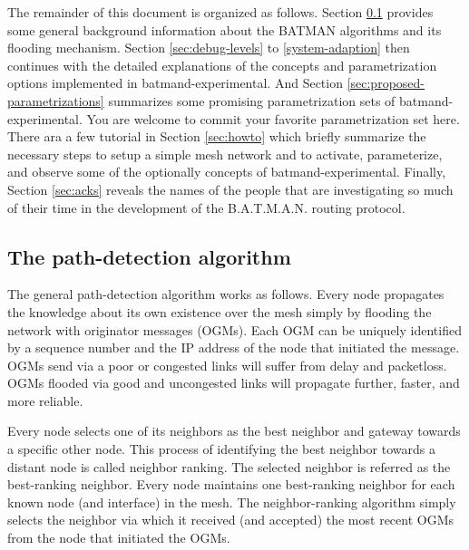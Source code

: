 \documentclass[11pt]{article}
\begin{document}
The remainder of this document is organized as follows.
%
Section \ref{sec:algorithm} provides some general background information about the BATMAN algorithms and its flooding mechanism. 
%
Section \ref{sec:debug-levels} to \ref{system-adaption} then continues with the detailed explanations of the concepts and parametrization options implemented in batmand-experimental.
%
And Section \ref{sec:proposed-parametrizations} summarizes some promising parametrization sets of batmand-experimental. You are welcome to commit your favorite parametrization set here.
%
There ara a few tutorial in Section \ref{sec:howto} which briefly summarize the necessary steps to setup a simple mesh network and to activate, parameterize, and observe some of the optionally concepts of batmand-experimental. 
%
Finally, Section \ref{sec:acks} reveals the names of the people that are investigating so much of their time in the development of the B.A.T.M.A.N. routing protocol.




\subsection{The path-detection algorithm}
\label{sec:algorithm}
The general path-detection algorithm works as follows.
Every node propagates the knowledge about its own existence over the mesh simply by flooding the network with originator messages (OGMs).
%
Each OGM can be uniquely identified by a sequence number and the IP address of the node that initiated the message.
%
OGMs send via a poor or congested links will suffer from delay and packetloss.
OGMs flooded via good and uncongested links will propagate further, faster, and more reliable.


%
Every node selects one of its neighbors as the best neighbor and gateway towards a specific other node.
%
This process of identifying the best neighbor towards a distant node is called neighbor ranking. 
%
The selected neighbor is referred as the best-ranking neighbor. 
%
Every node maintains one best-ranking neighbor for each known node (and interface) in the mesh.
%
The neighbor-ranking algorithm simply selects the neighbor via which it received (and accepted) the most recent OGMs from the node that initiated the OGMs.
%
\end{document}
